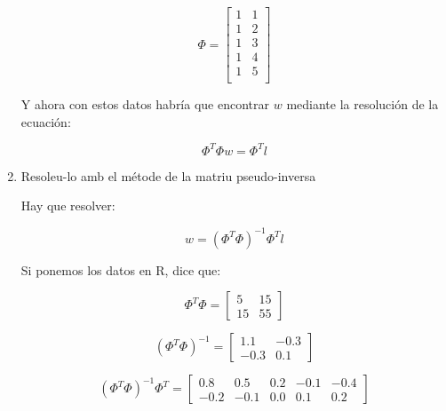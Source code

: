 \documentclass[a4paper]{article}
\begin{document}
\begin{enumerate}
{\begin{multicols}{3}
    \begin{equation*}
      \Phi =
      \begin{bmatrix}
        1 & 1 \\
        1 & 2\\
        1 & 3 \\
        1 & 4 \\
        1 & 5 \\
      \end{bmatrix}
    \end{equation*}

  \end{multicols}


Y ahora con estos datos habría que encontrar $w$ mediante la resolución de
la ecuación:

\begin{equation*}
  \Phi^T\Phi w = \Phi^T l
\end{equation*}

}


  \item Resoleu-lo amb el métode de la matriu pseudo-inversa

{\bfseries

  Hay que resolver:

  \begin{equation*}
    w = (\Phi^T\Phi)^{-1}\Phi^T l
  \end{equation*}

  Si ponemos los datos en R, dice que:

\begin{multicols}{2}

  \begin{equation*}
    \Phi^T\Phi =
    \begin{bmatrix}
        5 & 15 \\
        15 & 55
    \end{bmatrix}
  \end{equation*}

  \begin{equation*}
    (\Phi^T\Phi)^{-1} =
    \begin{bmatrix}
        1.1 & -0.3 \\
        -0.3 & 0.1
    \end{bmatrix}
  \end{equation*}


  \begin{equation*}
    (\Phi^T\Phi)^{-1} \Phi^T =
    \begin{bmatrix}
      0.8 & 0.5 & 0.2 & -0.1 & -0.4 \\
      -0.2 & -0.1 & 0.0 & 0.1 & 0.2
    \end{bmatrix}
  \end{equation*}


\end{multicols}}
\end{enumerate}
\end{document}
